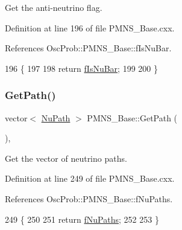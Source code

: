 Get the anti-\/neutrino flag. 

Definition at line 196 of file P\+M\+N\+S\+\_\+\+Base.\+cxx.



References Osc\+Prob\+::\+P\+M\+N\+S\+\_\+\+Base\+::f\+Is\+Nu\+Bar.


\begin{DoxyCode}
196                            \{
197 
198   \textcolor{keywordflow}{return} \hyperlink{classOscProb_1_1PMNS__Base_a0ebaeaefab36a3ff381c6293faedfdd6}{fIsNuBar};
199 
200 \}
\end{DoxyCode}
\mbox{\label{classOscProb_1_1PMNS__Base_ac8e196f2e85a2b1caaf705073ee95a5c}} 
\subsubsection{\texorpdfstring{Get\+Path()}{GetPath()}}
{\footnotesize\ttfamily vector$<$ \hyperlink{structOscProb_1_1NuPath}{Nu\+Path} $>$ P\+M\+N\+S\+\_\+\+Base\+::\+Get\+Path (\begin{DoxyParamCaption}{ }\end{DoxyParamCaption})\hspace{0.3cm}{\ttfamily [virtual]}, {\ttfamily [inherited]}}

Get the vector of neutrino paths. 

Definition at line 249 of file P\+M\+N\+S\+\_\+\+Base.\+cxx.



References Osc\+Prob\+::\+P\+M\+N\+S\+\_\+\+Base\+::f\+Nu\+Paths.


\begin{DoxyCode}
249                                  \{
250 
251   \textcolor{keywordflow}{return} \hyperlink{classOscProb_1_1PMNS__Base_a69db9d57e12fc7cbe0431bc6c18fac93}{fNuPaths};
252 
253 \}
\end{DoxyCode}
\mbox{\label{classOscProb_1_1PMNS__Base_a9eac8d768c1424755ee41f7e783af179}} 
